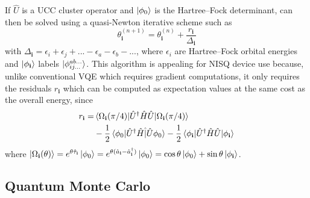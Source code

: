 \documentclass[%
 reprint,
 amsmath,amssymb,
 aps,
]{revtex4-2}
\begin{document}
If $\hat U$ is a UCC cluster operator and $\ket{\phi_0}$ is the Hartree--Fock determinant,  can then be solved using a quasi-Newton iterative scheme such as\cite{Stair2021} 
\begin{equation}
\theta_\mathbf{i}^{(n+1)} =\theta_\mathbf{i}^{(n)} + \frac{r_\mathbf{i}}{\Delta_\mathbf{i}}
\end{equation}
with ${\Delta_\mathbf{i}} = \epsilon_i + \epsilon_j + ... - \epsilon_a - \epsilon_b - ...$, where $\epsilon_i$ are Hartree--Fock orbital energies and $\ket{\phi_{\mathbf i}}$ labels $\ket{\phi_{ij...}^{ab...}}$. This algorithm is appealing for NISQ device use because, unlike conventional VQE which requires gradient computations, it only requires the residuals $r_\mathbf{i}$ which can be computed as expectation values at the same cost as the overall energy, since
\begin{align}
\begin{split}
r_\mathbf{i} = &\braket{\Omega_\mathbf{i}(\pi/4)|\hat U^\dagger \hat H \hat U|\Omega_\mathbf{i}(\pi/4)} \\
&- \frac{1}{2}\braket{\phi_0|\hat U^\dagger \hat H \hat|\hat U \phi_0} -\frac{1}{2}\braket{\phi_\mathbf{i}|\hat U^\dagger \hat H \hat U|\phi_\mathbf{i}}
\end{split}
\label{eq:exp_resid}
\end{align}
where $\ket{\Omega_\mathbf{i}(\theta)} = e^{\theta \hat \tau_\mathbf{i}}\ket{\phi_0} = e^{\theta (\hat a_\mathbf{i} - \hat a_\mathbf{i}^\dagger)}\ket{\phi_0} = {\cos{\theta}\ket{\phi_0} + \sin{\theta}\ket{\phi_\mathbf{i}}}$.

\subsection{Quantum Monte Carlo}\label{sec:qmc}
\end{document}
